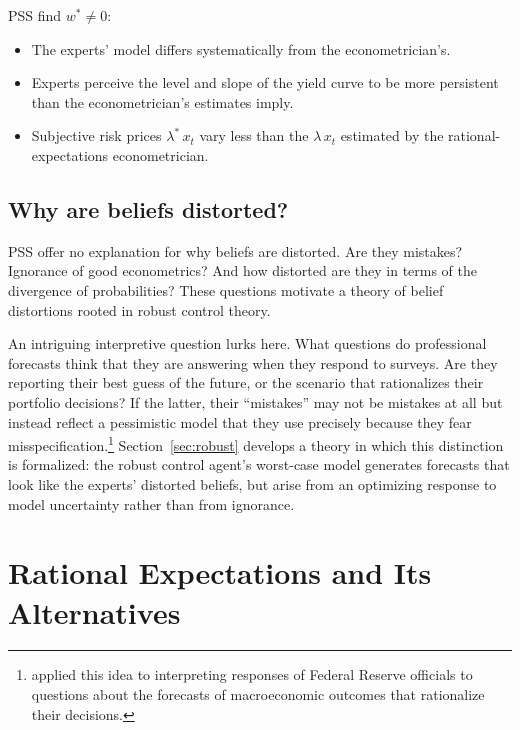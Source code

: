 \documentclass[12pt]{article}
\theoremstyle{definition}
\begin{document}
PSS find $w^* \neq 0$:
\begin{itemize}
\item The experts' model differs systematically from the
      econometrician's.
\item Experts perceive the level and slope of the yield curve to be more
      persistent than the econometrician's estimates imply.
\item Subjective risk prices $\lambda^*\, x_t$ vary less than the
      $\lambda\, x_t$ estimated by the rational-expectations
      econometrician.
\end{itemize}

\subsection{Why are beliefs distorted?}

PSS offer no explanation for why beliefs are distorted.  Are they
mistakes?  Ignorance of good econometrics?  And how distorted are they
in terms of the divergence of probabilities?  These questions motivate a
theory of belief distortions rooted in robust control theory.

An intriguing interpretive question lurks here. What questions do professional forecasts think that
they are answering when they respond to surveys. Are they reporting their best guess of the future, or the scenario
that rationalizes their portfolio decisions?  If the latter, their
``mistakes'' may not be mistakes at all but instead reflect a
pessimistic model that they use precisely because they fear
misspecification.\footnote{\citet{ellison2012defense} applied this idea to interpreting responses of  Federal Reserve officials to  questions about the forecasts of macroeconomic outcomes that rationalize their decisions.}  Section~\ref{sec:robust} develops a theory in which
this distinction is formalized: the robust control agent's worst-case
model generates forecasts that look like the experts' distorted beliefs,
but arise from an optimizing response to model uncertainty rather than
from ignorance.


\section{Rational Expectations and Its Alternatives}
\label{sec:RE-limits}
\end{document}
